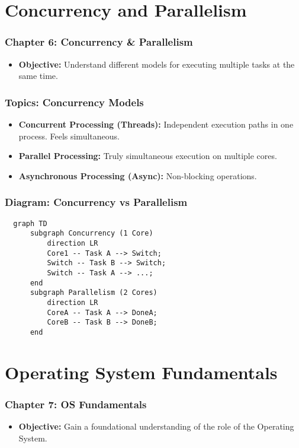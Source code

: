 \documentclass{beamer}
\begin{document}
\section{Concurrency and Parallelism}

\begin{frame}
  \frametitle{Chapter 6: Concurrency & Parallelism}
  \begin{itemize}
    \item \textbf{Objective:} Understand different models for executing multiple tasks at the same time.
  \end{itemize}
\end{frame}

\begin{frame}[fragile]
  \frametitle{Topics: Concurrency Models}
  \begin{itemize}
    \item \textbf{Concurrent Processing (Threads):} Independent execution paths in one process. Feels simultaneous.
    \item \textbf{Parallel Processing:} Truly simultaneous execution on multiple cores.
    \item \textbf{Asynchronous Processing (Async):} Non-blocking operations.
  \end{itemize}
\end{frame}

\begin{frame}[fragile]
  \frametitle{Diagram: Concurrency vs Parallelism}
  \begin{verbatim}
  graph TD
      subgraph Concurrency (1 Core)
          direction LR
          Core1 -- Task A --> Switch;
          Switch -- Task B --> Switch;
          Switch -- Task A --> ...;
      end
      subgraph Parallelism (2 Cores)
          direction LR
          CoreA -- Task A --> DoneA;
          CoreB -- Task B --> DoneB;
      end
  \end{verbatim}
\end{frame}

\section{Operating System Fundamentals}

\begin{frame}
  \frametitle{Chapter 7: OS Fundamentals}
  \begin{itemize}
    \item \textbf{Objective:} Gain a foundational understanding of the role of the Operating System.
  \end{itemize}
\end{frame}
\end{document}
